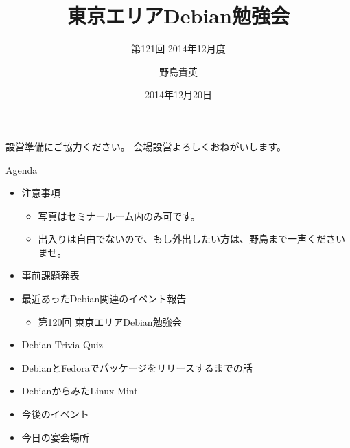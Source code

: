 \title{東京エリアDebian勉強会}
\subtitle{第121回 2014年12月度}
\author{野島貴英}
\date{2014年12月20日}



\begin{frame}
\titlepage{}
\end{frame}

\begin{frame}{設営準備にご協力ください。}
会場設営よろしくおねがいします。
\end{frame}

\begin{frame}{Agenda}
 \begin{minipage}[t]{0.45\hsize}
  \begin{itemize}
   \item 注意事項
	 \begin{itemize}
	  \item 写真はセミナールーム内のみ可です。
          \item 出入りは自由でないので、もし外出したい方は、野島まで一声くださいませ。
	 \end{itemize}
   \item 事前課題発表
  \end{itemize}
 \end{minipage} 
 \begin{minipage}[t]{0.45\hsize}
  \begin{itemize}
   \item 最近あったDebian関連のイベント報告
	 \begin{itemize}
	  \item 第120回 東京エリアDebian勉強会
	 \end{itemize}
   \item Debian Trivia Quiz
   \item DebianとFedoraでパッケージをリリースするまでの話
   \item DebianからみたLinux Mint
   \item 今後のイベント
   \item 今日の宴会場所
  \end{itemize}
 \end{minipage}
\end{frame}

